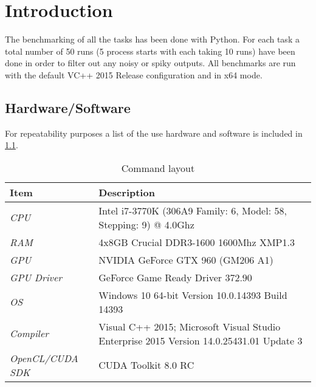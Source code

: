 \documentclass[final]{report}
\begin{document}
\chapter{Introduction}
The benchmarking of all the tasks has been done with Python.
For each task a total number of 50 runs (5 process starts with each taking 10 runs) have been done in order to filter out any noisy or spiky outputs.
All benchmarks are run with the default VC++ 2015 Release configuration and in x64 mode.

\section{Hardware/Software}
For repeatability purposes a list of the use hardware and software is included in \cref{tab:hardware-software}.

\begin{table}[H]
\centering
\caption{Command layout}
\label{tab:hardware-software}
\begin{tabular}{lp{9cm}}
\toprule
\textbf{Item} & \textbf{Description} \\
\midrule
\textit{CPU} & Intel i7-3770K (306A9 Family: 6, Model: 58, Stepping: 9) @ 4.0Ghz\\
\textit{RAM} & 4x8GB Crucial DDR3-1600 1600Mhz XMP1.3\\
\textit{GPU} & NVIDIA GeForce GTX 960 (GM206 A1)\\
\textit{GPU Driver} & GeForce Game Ready Driver 372.90\\
\textit{OS} & Windows 10 64-bit Version 10.0.14393 Build 14393\\
\textit{Compiler} & Visual C++ 2015; Microsoft Visual Studio Enterprise 2015 Version 14.0.25431.01 Update 3\\
\textit{OpenCL/CUDA SDK} & CUDA Toolkit 8.0 RC\\
\bottomrule
\end{tabular}
\end{table}
\end{document}
